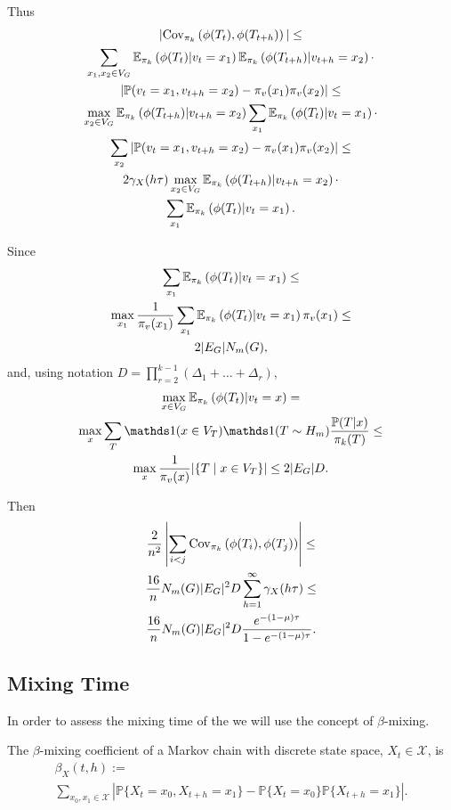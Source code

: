 Thus
\begin{multline*}
    |\mathrm{Cov}_{\pi_k}\left(\phi(T_t), \phi(T_{t+h})\right)| \leq \\
    \sum_{x_1,x_2\in V_G}  \mathbb{E}_{\pi_k}\left(\phi(T_t)|v_t = x_1\right) \mathbb{E}_{\pi_k}\left(\phi(T_{t+h})|v_{t+h}=x_2\right)\cdot\\
    \left\vert \mathbb{P}(v_t=x_1,v_{t+h}=x_2) - \pi_v(x_1)\pi_v(x_2)\right\vert\leq \\
    \max_{x_2\in V_G}  \mathbb{E}_{\pi_k}\left(\phi(T_{t+h})|v_{t+h}=x_2\right) 
    \sum_{x_1} \mathbb{E}_{\pi_k}\left(\phi(T_t)|v_t = x_1\right)\cdot\\
    \sum_{x_2} \left\vert \mathbb{P}(v_t=x_1,v_{t+h}=x_2) - \pi_v(x_1)\pi_v(x_2)\right\vert\leq \\
      2\gamma_X(h\tau) \max_{x_2\in V_G}  \mathbb{E}_{\pi_k}\left(\phi(T_{t+h})|v_{t+h}=x_2\right)\cdot\\
      \sum_{x_1} \mathbb{E}_{\pi_k}\left(\phi(T_t)|v_t = x_1\right).
\end{multline*}

Since 
\begin{multline}
    \sum_{x_1}\mathbb{E}_{\pi_k}\left(\phi(T_t)|v_t = x_1\right) \leq\\
    \max_{x_1}\frac{1}{\pi_v(x_1)} \sum_{x_1}\mathbb{E}_{\pi_k}\left(\phi(T_t)|v_t = x_1\right) \pi_v(x_1)\leq\\
    2|E_G| N_m(G),
\end{multline}
and, using notation $D = \prod_{r=2}^{k-1} (\Delta_1 +\ldots + \Delta_r)$,
\begin{multline*}
    \max_{x\in V_G} \E_{\pi_k}\left(\phi(T_t)|v_t=x\right) =\\
    \max_x \sum_T \ind(x\in V_T) \ind(T\sim H_m)\frac{\P(T|x)}{\pi_k(T)} \leq \\
    \max_x \frac{1}{\pi_v(x)} |\{T\mid x\in V_T\}|\leq
    2|E_G| D.
\end{multline*}

Then
\begin{multline*}
    \frac{2}{n^2} \left\vert\sum_{i < j} \mathrm{Cov}_{\pi_k}\left(\phi(T_i), \phi(T_j)\right) \right\vert \leq\\
    \frac{16}{n} N_m(G)|E_G|^2 D \sum_{h=1}^\infty \gamma_X(h\tau) \leq \\
    \frac{16}{n} N_m(G)|E_G|^2 D \frac{e^{-(1-\mu)\tau}}{1-e^{-(1-\mu)\tau}}.
\end{multline*}

\subsection{Mixing Time}
In order to assess the mixing time of the we will use the concept of $\beta$-mixing.
\begin{definition}
  The $\beta$-mixing coefficient of a Markov chain with discrete state space, $X_t \in \mathcal X$, is
  \begin{multline*}
    \beta_X(t,h) :=\\
    \sum_{x_0,x_1 \in \mathcal X} |\mathbb P\{ X_t = x_0, X_{t+h} = x_1\} - \mathbb P\{ X_t = x_0 \} \mathbb P\{ X_{t+h} = x_1 \} |.
  \end{multline*}
\end{definition}

